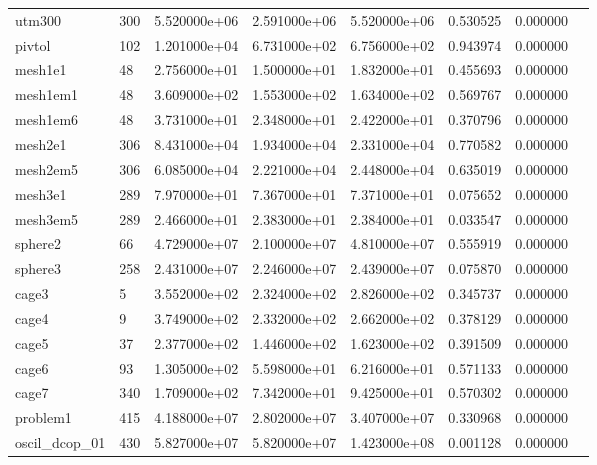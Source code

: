 \begin{tabular}{llrrrrrr}
utm300                  &  300 &  5.520000e+06 &  2.591000e+06 &  5.520000e+06 &  0.530525 &  0.000000 \\
pivtol                  &  102 &  1.201000e+04 &  6.731000e+02 &  6.756000e+02 &  0.943974 &  0.000000 \\
mesh1e1                 &   48 &  2.756000e+01 &  1.500000e+01 &  1.832000e+01 &  0.455693 &  0.000000 \\
mesh1em1                &   48 &  3.609000e+02 &  1.553000e+02 &  1.634000e+02 &  0.569767 &  0.000000 \\
mesh1em6                &   48 &  3.731000e+01 &  2.348000e+01 &  2.422000e+01 &  0.370796 &  0.000000 \\
mesh2e1                 &  306 &  8.431000e+04 &  1.934000e+04 &  2.331000e+04 &  0.770582 &  0.000000 \\
mesh2em5                &  306 &  6.085000e+04 &  2.221000e+04 &  2.448000e+04 &  0.635019 &  0.000000 \\
mesh3e1                 &  289 &  7.970000e+01 &  7.367000e+01 &  7.371000e+01 &  0.075652 &  0.000000 \\
mesh3em5                &  289 &  2.466000e+01 &  2.383000e+01 &  2.384000e+01 &  0.033547 &  0.000000 \\
sphere2                 &   66 &  4.729000e+07 &  2.100000e+07 &  4.810000e+07 &  0.555919 &  0.000000 \\
sphere3                 &  258 &  2.431000e+07 &  2.246000e+07 &  2.439000e+07 &  0.075870 &  0.000000 \\
cage3                   &    5 &  3.552000e+02 &  2.324000e+02 &  2.826000e+02 &  0.345737 &  0.000000 \\
cage4                   &    9 &  3.749000e+02 &  2.332000e+02 &  2.662000e+02 &  0.378129 &  0.000000 \\
cage5                   &   37 &  2.377000e+02 &  1.446000e+02 &  1.623000e+02 &  0.391509 &  0.000000 \\
cage6                   &   93 &  1.305000e+02 &  5.598000e+01 &  6.216000e+01 &  0.571133 &  0.000000 \\
cage7                   &  340 &  1.709000e+02 &  7.342000e+01 &  9.425000e+01 &  0.570302 &  0.000000 \\
problem1                &  415 &  4.188000e+07 &  2.802000e+07 &  3.407000e+07 &  0.330968 &  0.000000 \\
oscil\_dcop\_01           &  430 &  5.827000e+07 &  5.820000e+07 &  1.423000e+08 &  0.001128 &  0.000000 \\

\end{tabular}
